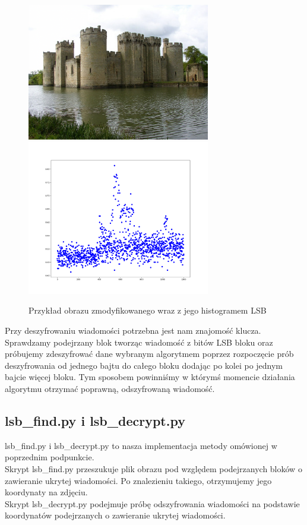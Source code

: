 \documentclass{article}
\begin{document}
\begin{figure}[H]
	\centering
	\includegraphics[width=8cm]{modified_castle.png}
	\includegraphics[width=8cm]{mod_hist.png}
	\caption{Przykład obrazu zmodyfikowanego wraz z jego histogramem LSB}
\end{figure}
Przy deszyfrowaniu wiadomości potrzebna jest nam znajomość klucza. Sprawdzamy podejrzany blok tworząc wiadomość z bitów LSB bloku oraz próbujemy zdeszyfrować dane wybranym algorytmem poprzez rozpoczęcie prób deszyfrowania od jednego bajtu do całego bloku dodając po kolei po jednym bajcie więcej bloku. Tym sposobem powinniśmy w którymś momencie działania algorytmu otrzymać poprawną, odszyfrowaną wiadomość.

\subsection*{lsb\_find.py i lsb\_decrypt.py}
lsb\_find.py i lsb\_decrypt.py to nasza implementacja metody omówionej w poprzednim podpunkcie. \\

Skrypt lsb\_find.py przeszukuje plik obrazu pod względem podejrzanych bloków o zawieranie ukrytej wiadomości. Po znalezieniu takiego, otrzymujemy jego koordynaty na zdjęciu.\\
Skrypt lsb\_decrypt.py podejmuje próbę odszyfrowania wiadomości na podstawie koordynatów podejrzanych o zawieranie ukrytej wiadomości.\\
\end{document}
